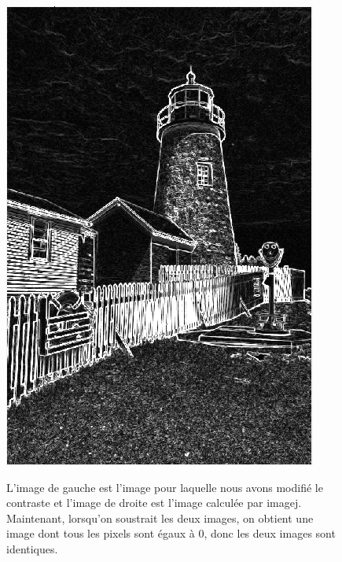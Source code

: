 \documentclass[a4paper,12pt]{report}
\begin{document}
\begin{figure}[!ht]
\begin{center}
		\includegraphics[scale=0.4]{./imageResultats/gradient_imagej.png}
	\end{center}
L'image de gauche est l'image pour laquelle nous avons modifié le contraste et l'image de droite est l'image calculée par imagej. Maintenant, lorsqu'on soustrait les deux images, on obtient une image dont tous les pixels sont égaux à 0, donc les deux images sont identiques.
\end{figure}
\newpage
\end{document}
